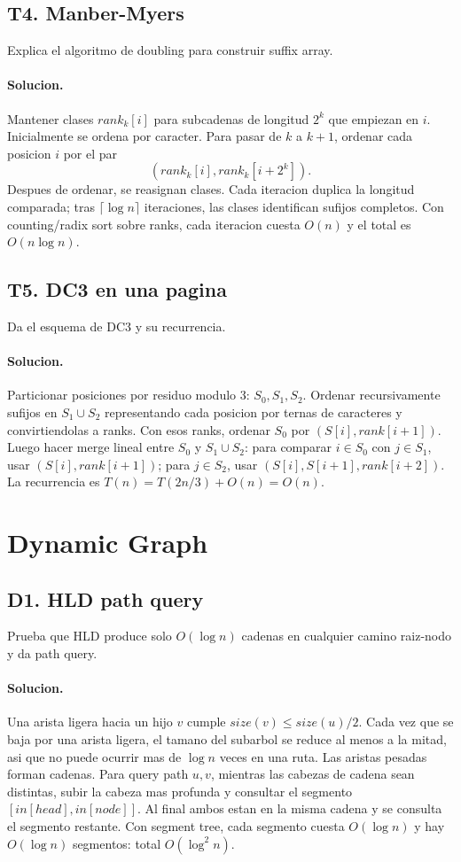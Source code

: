 \documentclass[10pt]{article}
\newcommand{\bigO}{O}
\begin{document}
\subsection*{T4. Manber-Myers}
Explica el algoritmo de doubling para construir suffix array.

\paragraph{Solucion.}
Mantener clases $rank_k[i]$ para subcadenas de longitud $2^k$ que empiezan en
$i$. Inicialmente se ordena por caracter. Para pasar de $k$ a $k+1$, ordenar cada
posicion $i$ por el par
\[
(rank_k[i], rank_k[i+2^k]).
\]
Despues de ordenar, se reasignan clases. Cada iteracion duplica la longitud
comparada; tras $\lceil\log n\rceil$ iteraciones, las clases identifican sufijos
completos. Con counting/radix sort sobre ranks, cada iteracion cuesta
$\bigO(n)$ y el total es $\bigO(n\log n)$.

\subsection*{T5. DC3 en una pagina}
Da el esquema de DC3 y su recurrencia.

\paragraph{Solucion.}
Particionar posiciones por residuo modulo 3: $S_0,S_1,S_2$. Ordenar
recursivamente sufijos en $S_1\cup S_2$ representando cada posicion por ternas
de caracteres y convirtiendolas a ranks. Con esos ranks, ordenar $S_0$ por
$(S[i], rank[i+1])$. Luego hacer merge lineal entre $S_0$ y $S_1\cup S_2$:
para comparar $i\in S_0$ con $j\in S_1$, usar
$(S[i],rank[i+1])$; para $j\in S_2$, usar
$(S[i],S[i+1],rank[i+2])$. La recurrencia es
$T(n)=T(2n/3)+\bigO(n)=\bigO(n)$.

\section{Dynamic Graph}

\subsection*{D1. HLD path query}
Prueba que HLD produce solo $\bigO(\log n)$ cadenas en cualquier camino
raiz-nodo y da path query.

\paragraph{Solucion.}
Una arista ligera hacia un hijo $v$ cumple $size(v)\le size(u)/2$. Cada vez que
se baja por una arista ligera, el tamano del subarbol se reduce al menos a la
mitad, asi que no puede ocurrir mas de $\log n$ veces en una ruta. Las aristas
pesadas forman cadenas. Para query path $u,v$, mientras las cabezas de cadena
sean distintas, subir la cabeza mas profunda y consultar el segmento
$[in[head],in[node]]$. Al final ambos estan en la misma cadena y se consulta el
segmento restante. Con segment tree, cada segmento cuesta $\bigO(\log n)$ y hay
$\bigO(\log n)$ segmentos: total $\bigO(\log^2 n)$.
\end{document}
